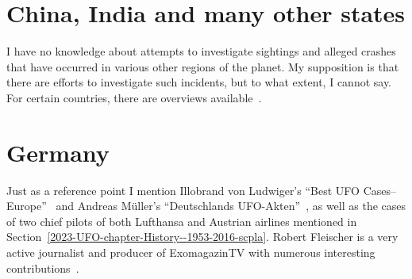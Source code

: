 

\section{China, India and many other states}
\label{2023-UFO-part-Perception-types-China}

I have no knowledge about attempts to investigate sightings and alleged crashes that have occurred in various other regions of the planet. My supposition is that there are efforts to investigate such incidents, but to what extent, I cannot say. For certain countries, there are overviews available~\cite{Swords2012Jul}.



\section{Germany}
\label{2023-UFO-part-Perception-types-Germany}

Just as a reference point I mention
Illobrand von Ludwiger's ``Best {UFO} Cases--{E}urope''~\cite{VonLudwigerNIDS}
and
Andreas  M\"uller's ``{D}eutschlands {UFO}-Akten''~\cite{Muller2021Nov},
as well as the cases of two chief pilots of both Lufthansa and Austrian airlines mentioned in Section~\ref{2023-UFO-chapter-History--1953-2016-scpla}.
Robert Fleischer is a very active journalist and producer of ExomagazinTV with numerous interesting contributions~\cite{ExoMagazinTV2022Oct}.
